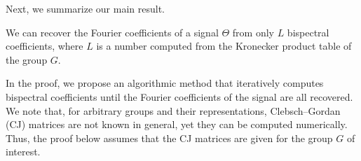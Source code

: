 Next, we summarize our main result.

\begin{proposition}
    We can recover the Fourier coefficients of a signal $\Theta$ from only $L$ bispectral coefficients, where $L$ is a number computed from the Kronecker product table of the group $G$.
\end{proposition}

In the proof, we propose an algorithmic method that iteratively computes bispectral coefficients until the Fourier coefficients of the signal are all recovered. We note that, for arbitrary groups and their representations, Clebsch–Gordan (CJ) matrices are not known in general, yet they can be computed numerically. Thus, the proof below assumes that the CJ matrices are given for the group $G$ of interest.

